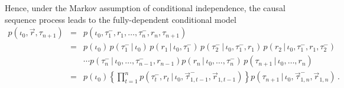 \documentclass[a4paper]{article}
\newcommand{\vr}{\vec{r}}
\newcommand{\tm}{\tau^{-}}
\begin{document}
Hence, under the Markov assumption of conditional independence,
the causal sequence process leads to the fully-dependent conditional model
\begin{eqnarray}
p(\iota_0,\vr,\tau_{n+1}) & = &
p(\iota_0,\tm_1,r_1,\ldots,\tm_n,r_n,\tau_{n+1})
\nonumber\\
& = &
p(\iota_0)
\,p(\tm_1\,|\,\iota_0)
\,p(r_1\,|\,\iota_0,\tm_1)
\,p(\tm_2\,|\,\iota_0,\tm_1,r_1)
\, p(r_2\,|\,\iota_0,\tm_1,r_1,\tm_2)
\nonumber\\
&&
\cdots
p(\tm_n\,|\,\iota_0,\ldots,\tm_{n-1},r_{n-1})
p(r_n\,|\,\iota_0,\ldots,\tm_{n})
\, p(\tau_{n+1}\,|\,\iota_0,\ldots,r_n)
\nonumber\\
& = &
p(\iota_0)
\left\{\prod_{t=1}^{n}p(\tm_t,r_t\,|\,\iota_0,\vec{\tau}^-_{1,t-1},\vr_{1,t-1})\right\}
 p(\tau_{n+1}\,|\,\iota_0,\vec{\tau}^-_{1,n},\vr_{1,n})
\,.
\label{eq:temporal-model-full}
\end{eqnarray}
\end{document}
